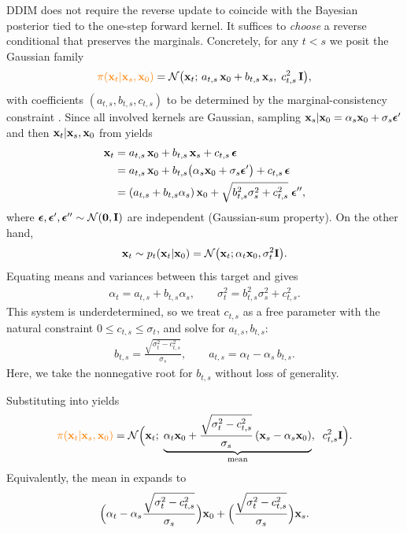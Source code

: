 DDIM does not require the reverse update to coincide with the Bayesian posterior tied to the
one-step forward kernel. It suffices to \emph{choose} a reverse conditional that preserves the
marginals. Concretely, for any $t<s$ we posit the Gaussian family
\begin{align}\label{eq:ddim-reverse-kernel-param}
{\color{orange}\pi({\mathbf{x}}_t|{\mathbf{x}}_s,{\mathbf{x}}_0)}
= \mathcal{N} \big({\mathbf{x}}_t;\, a_{t,s}\,{\mathbf{x}}_0 + b_{t,s}\,{\mathbf{x}}_s,\; c_{t,s}^2\,\mathbf{I}\big),
\end{align}
with coefficients $(a_{t,s},b_{t,s},c_{t,s})$ to be determined by the marginal-consistency
constraint . Since all involved kernels are Gaussian, sampling
${\mathbf{x}}_s|{\mathbf{x}}_0=\alpha_s{\mathbf{x}}_0+\sigma_s{\bm{\epsilon}}'$ and then
${\mathbf{x}}_t|{\mathbf{x}}_s,{\mathbf{x}}_0$ from  yields
\begin{align}\label{eq:ddim-derivation} 
\begin{aligned}
{\mathbf{x}}_t
&= a_{t,s}\,{\mathbf{x}}_0 + b_{t,s}\,{\mathbf{x}}_s + c_{t,s}\,{\bm{\epsilon}}
\\&= a_{t,s}\,{\mathbf{x}}_0 + b_{t,s}\big(\alpha_s{\mathbf{x}}_0+\sigma_s{\bm{\epsilon}}'\big) + c_{t,s}\,{\bm{\epsilon}} \\
&= (a_{t,s} + b_{t,s}\alpha_s)\,{\mathbf{x}}_0
+ \sqrt{b_{t,s}^2\sigma_s^2 + c_{t,s}^2}\;{\bm{\epsilon}}'',
\end{aligned}
\end{align}
where ${\bm{\epsilon}},{\bm{\epsilon}}',{\bm{\epsilon}}''\sim\mathcal{N}(\mathbf{0},\mathbf{I})$ are independent (Gaussian-sum
property). On the other hand,
\[
{\mathbf{x}}_t\sim p_t({\mathbf{x}}_t|{\mathbf{x}}_0)
= \mathcal{N} \big({\mathbf{x}}_t; \alpha_t{\mathbf{x}}_0, \sigma_t^2\mathbf{I}\big).
\]
Equating means and variances between this target and  gives
\begin{align*}
\alpha_t = a_{t,s} + b_{t,s}\alpha_s,
\qquad
\sigma_t^2 = b_{t,s}^2\sigma_s^2 + c_{t,s}^2.
\end{align*}
This system is underdetermined, so we treat $c_{t,s}$ as a free parameter with the natural constraint
$0\le c_{t,s} \le \sigma_t$, and solve for $a_{t,s},b_{t,s}$:
\begin{align}\label{eq:ddim-coefficients}
b_{t,s} = \frac{\sqrt{\sigma_t^2 - c_{t,s}^2}}{\sigma_s},
\qquad
a_{t,s} = \alpha_t - \alpha_s\,b_{t,s}.
\end{align}
Here, we take the nonnegative root for $b_{t,s}$ without loss of generality.

Substituting  into  yields
\begin{align}\label{eq:ddim-reverse-kernel-result}
{\color{orange}\pi({\mathbf{x}}_t|{\mathbf{x}}_s,{\mathbf{x}}_0)}
= \mathcal{N} \Big(
{\mathbf{x}}_t;\;
\underbrace{\alpha_t{\mathbf{x}}_0
+ \frac{\sqrt{\sigma_t^2 - c_{t,s}^2}}{\sigma_s}\,({\mathbf{x}}_s - \alpha_s{\mathbf{x}}_0)}_{\text{mean}},
\;\; c_{t,s}^2\mathbf{I}\Big).
\end{align}
Equivalently, the mean in  expands to
\[
\Big(\alpha_t - \alpha_s\frac{\sqrt{\sigma_t^2 - c_{t,s}^2}}{\sigma_s}\Big){\mathbf{x}}_0
+ \Big(\frac{\sqrt{\sigma_t^2 - c_{t,s}^2}}{\sigma_s}\Big){\mathbf{x}}_s.
\]

